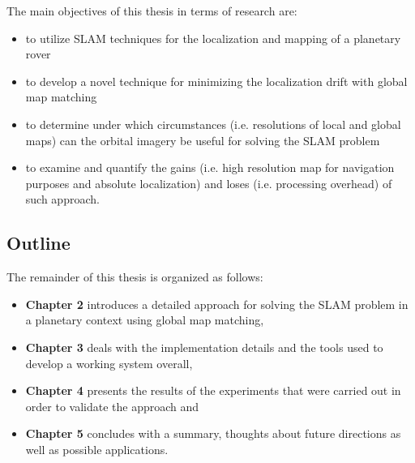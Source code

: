 The main objectives of this thesis in terms of research are:

\begin{itemize}
    \item to utilize SLAM techniques for the localization and mapping
        of a planetary rover
    \item to develop a novel technique for minimizing the localization
        drift with global map matching
    \item to determine under which circumstances (i.e. resolutions of
        local and global maps) can the orbital imagery be useful for
        solving the SLAM problem
    \item to examine and quantify the gains (i.e. high resolution map for
        navigation purposes and absolute localization) and loses
        (i.e. processing overhead) of such approach.
\end{itemize}

\subsection{Outline}

The remainder of this thesis is organized as follows:
\begin{itemize}
    \item \textbf{Chapter 2} introduces a detailed approach for solving the
        SLAM problem in a planetary context using global map matching,
    \item \textbf{Chapter 3} deals with the implementation details and
        the tools used to develop a working system overall,
    \item \textbf{Chapter 4} presents the results of the experiments that
        were carried out in order to validate the approach and
    \item \textbf{Chapter 5} concludes with a summary, thoughts about future
        directions as well as possible applications.
\end{itemize}


